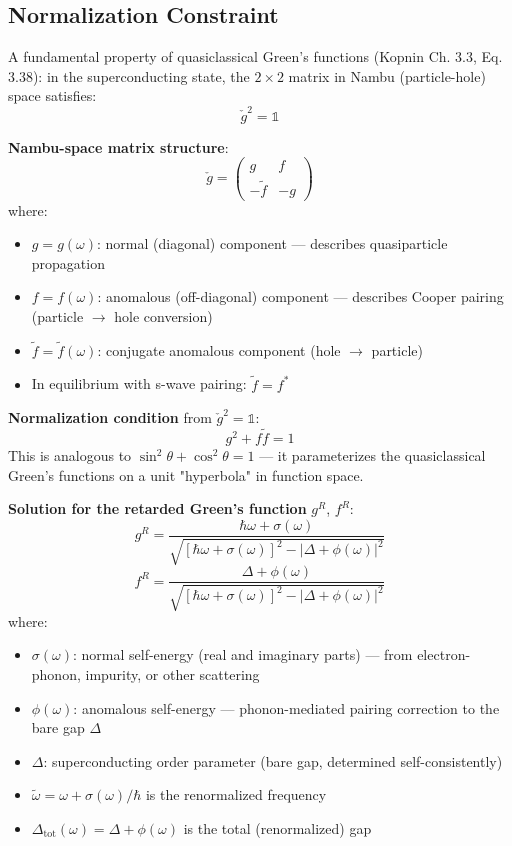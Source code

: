 \documentclass[12pt]{article}
\begin{document}
\subsection{Normalization Constraint}

A fundamental property of quasiclassical Green's functions (Kopnin Ch. 3.3, Eq. 3.38): in the superconducting state, the $2\times2$ matrix in Nambu (particle-hole) space satisfies:
\begin{equation}
\check{g}^2 = \mathbb{1}
\end{equation}

\textbf{Nambu-space matrix structure}:
\begin{equation}
\check{g} = \begin{pmatrix}
g & f \\
-\tilde{f} & -g
\end{pmatrix}
\end{equation}
where:
\begin{itemize}
\item $g = g(\omega)$: normal (diagonal) component — describes quasiparticle propagation
\item $f = f(\omega)$: anomalous (off-diagonal) component — describes Cooper pairing (particle $\to$ hole conversion)
\item $\tilde{f} = \tilde{f}(\omega)$: conjugate anomalous component (hole $\to$ particle)
\item In equilibrium with s-wave pairing: $\tilde{f} = f^*$
\end{itemize}

\textbf{Normalization condition} from $\check{g}^2 = \mathbb{1}$:
\begin{equation}
\boxed{
g^2 + f \tilde{f} = 1
}
\end{equation}
This is analogous to $\sin^2\theta + \cos^2\theta = 1$ — it parameterizes the quasiclassical Green's functions on a unit "hyperbola" in function space.

\textbf{Solution for the retarded Green's function} $g^R$, $f^R$:
\begin{equation}
\boxed{
g^R = \frac{\hbar\omega + \sigma(\omega)}{\sqrt{[\hbar\omega + \sigma(\omega)]^2 - |\Delta + \phi(\omega)|^2}}
}
\end{equation}
\begin{equation}
\boxed{
f^R = \frac{\Delta + \phi(\omega)}{\sqrt{[\hbar\omega + \sigma(\omega)]^2 - |\Delta + \phi(\omega)|^2}}
}
\end{equation}
where:
\begin{itemize}
\item $\sigma(\omega)$: normal self-energy (real and imaginary parts) — from electron-phonon, impurity, or other scattering
\item $\phi(\omega)$: anomalous self-energy — phonon-mediated pairing correction to the bare gap $\Delta$
\item $\Delta$: superconducting order parameter (bare gap, determined self-consistently)
\item $\tilde{\omega} = \omega + \sigma(\omega)/\hbar$ is the renormalized frequency
\item $\Delta_{\text{tot}}(\omega) = \Delta + \phi(\omega)$ is the total (renormalized) gap
\end{itemize}
\end{document}
